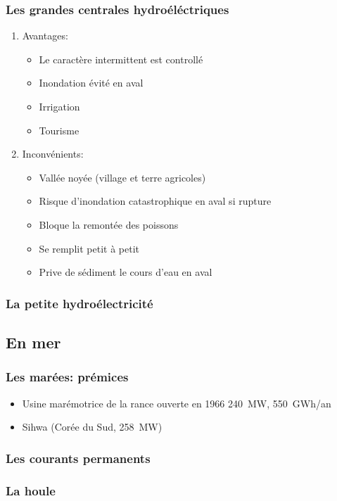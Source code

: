 \documentclass[main.tex]{subfiles}
\begin{document}
\subsubsection{Les grandes centrales hydroéléctriques}
\begin{enumerate}
\item Avantages:
  \begin{itemize}
  \item Le caractère intermittent est controllé
  \item Inondation évité en aval
  \item Irrigation
  \item Tourisme
  \end{itemize}
\item Inconvénients:
  \begin{itemize}
  \item Vallée noyée (village et terre agricoles)
  \item Risque d'inondation catastrophique en aval si rupture
  \item Bloque la remontée des poissons
  \item Se remplit petit à petit
  \item Prive de sédiment le cours d'eau en aval
  \end{itemize}
\end{enumerate}

\subsubsection{La petite hydroélectricité}
\subsection{En mer}

\subsubsection{Les marées: prémices}
\begin{itemize}
\item Usine marémotrice de la rance ouverte en 1966 \SI{240}{MW}, \SI{550}{GWh/an}
\item Sihwa (Corée du Sud, \SI{258}{MW})
\end{itemize}
\subsubsection{Les courants permanents}
\subsubsection{La houle}
\end{document}
